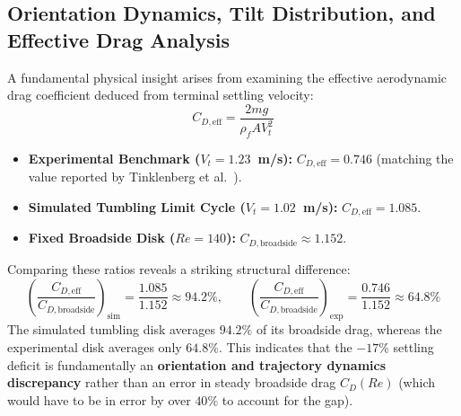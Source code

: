 \documentclass[11pt,a4paper]{article}
\begin{document}
\subsection{Orientation Dynamics, Tilt Distribution, and Effective Drag Analysis}
A fundamental physical insight arises from examining the effective aerodynamic drag coefficient deduced from terminal settling velocity:
\begin{equation}
C_{D,\mathrm{eff}} = \frac{2 m g}{\rho_f A V_t^2}
\end{equation}
\begin{itemize}
    \item \textbf{Experimental Benchmark ($V_t = 1.23$~m/s):} $C_{D,\mathrm{eff}} = 0.746$ (matching the value reported by Tinklenberg et al.\ \cite{tinklenberg2023}).
    \item \textbf{Simulated Tumbling Limit Cycle ($V_t = 1.02$~m/s):} $C_{D,\mathrm{eff}} = 1.085$.
    \item \textbf{Fixed Broadside Disk ($Re = 140$):} $C_{D,\mathrm{broadside}} \approx 1.152$.
\end{itemize}
Comparing these ratios reveals a striking structural difference:
\begin{equation}
\left( \frac{C_{D,\mathrm{eff}}}{C_{D,\mathrm{broadside}}} \right)_{\mathrm{sim}} = \frac{1.085}{1.152} \approx 94.2\%, \qquad
\left( \frac{C_{D,\mathrm{eff}}}{C_{D,\mathrm{broadside}}} \right)_{\mathrm{exp}} = \frac{0.746}{1.152} \approx 64.8\%
\end{equation}
The simulated tumbling disk averages $94.2\%$ of its broadside drag, whereas the experimental disk averages only $64.8\%$. This indicates that the $-17\%$ settling deficit is fundamentally an \textbf{orientation and trajectory dynamics discrepancy} rather than an error in steady broadside drag $C_D(Re)$ (which would have to be in error by over $40\%$ to account for the gap).
\end{document}
